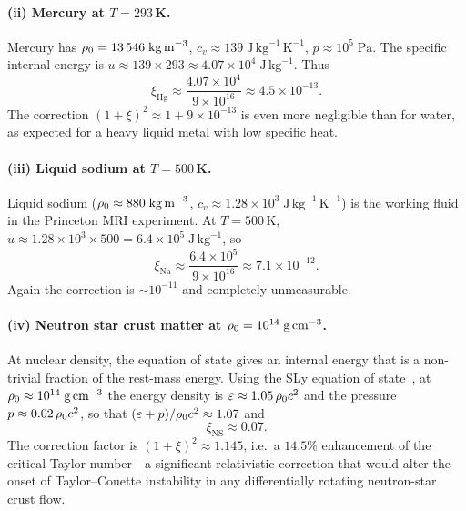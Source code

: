\paragraph{(ii) Mercury at $T = 293$\,K.}
Mercury has $\rho_0 = 13\,546\;\mathrm{kg\,m}^{-3}$,
$c_{v}\approx 139\;\mathrm{J\,kg}^{-1}\,\mathrm{K}^{-1}$,
$p\approx 10^{5}\;\mathrm{Pa}$.  The specific internal energy is
$u \approx 139\times 293 \approx 4.07\times10^{4}\;\mathrm{J\,kg}^{-1}$.
Thus
\begin{equation}
\xi_{\mathrm{Hg}}
  \approx \frac{4.07\times10^{4}}{9\times10^{16}}
  \approx 4.5\times10^{-13}.
\end{equation}
The correction $(1+\xi)^{2} \approx 1 + 9\times10^{-13}$ is
even more negligible than for water, as expected for a heavy
liquid metal with low specific heat.

\paragraph{(iii) Liquid sodium at $T = 500$\,K.}
Liquid sodium ($\rho_0 \approx 880\;\mathrm{kg\,m}^{-3}$,
$c_{v}\approx 1.28\times10^{3}\;\mathrm{J\,kg}^{-1}\,\mathrm{K}^{-1}$)
is the working fluid in the Princeton MRI experiment.  At $T = 500$\,K,
$u \approx 1.28\times10^{3}\times500 = 6.4\times10^{5}\;\mathrm{J\,kg}^{-1}$,
so
\begin{equation}
\xi_{\mathrm{Na}}
  \approx \frac{6.4\times10^{5}}{9\times10^{16}}
  \approx 7.1\times10^{-12}.
\end{equation}
Again the correction is $\sim 10^{-11}$ and completely unmeasurable.

\paragraph{(iv) Neutron star crust matter at $\rho_0 = 10^{14}\;\mathrm{g\,cm}^{-3}$.}
At nuclear density, the equation of state gives an internal energy
that is a non-trivial fraction of the rest-mass energy.  Using the
SLy equation of state~\citep{DouchinHaensel2001}, at
$\rho_0 \approx 10^{14}\;\mathrm{g\,cm}^{-3}$ the energy density
is $\varepsilon \approx 1.05\,\rho_0 c^{2}$ and the pressure
$p \approx 0.02\,\rho_0 c^{2}$, so that
$(\varepsilon + p)/\rho_0 c^{2} \approx 1.07$ and
\begin{equation}
\xi_{\mathrm{NS}}
  \approx 0.07.
\end{equation}
The correction factor is
$(1+\xi)^{2} \approx 1.145$, i.e.\ a $14.5\%$ enhancement of
the critical Taylor number---a significant relativistic correction
that would alter the onset of Taylor--Couette instability in any
differentially rotating neutron-star crust flow.

